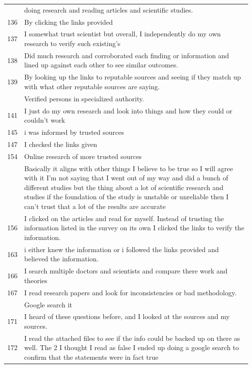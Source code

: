 \documentclass[
  doc,floatsintext]{apa6}
\begin{document}
\begin{longtable}[t]{>{}r>{\raggedright\arraybackslash}p{30em}}
\addlinespace
135 & doing research and reading articles and scientific studies.\\
136 & By clicking the links provided\\
137 & I somewhat trust scientist but overall, I independently do my own research to verify such existing's\\
138 & Did much research and corroborated each finding or information and lined up against each other to see similar outcomes.\\
139 & By looking up the links to reputable sources and seeing if they match up with what other reputable sources are saying.\\
\addlinespace
140 & Verified persons in specialized authority.\\
141 & I just do my own research and look into things and how they could or couldn’t work\\
145 & i was informed  by trusted sources\\
147 & I checked the links given\\
154 & Online research of more trusted sources\\
\addlinespace
155 & Basically it aligns with other things I believe to be true so I will agree with it I'm not saying that I went out of my way and did a bunch of different studies but the thing about a lot of scientific research and studies if the foundation of the study is unstable or unreliable then I can't trust that a lot of the results are accurate\\
156 & I clicked on the articles and read for myself. Instead of trusting the information listed in the survey on its own I clicked the links to verify the information.\\
163 & i either knew the information or i followed the links provided and believed the information.\\
166 & I search multiple doctors and scientists and compare there work and theories\\
167 & I read research papers and look for inconsistencies or bad methodology.\\
\addlinespace
170 & Google search it\\
171 & I heard of these questions before, and I looked at the sources and my sources.\\
172 & I read the attached files to see if the info could be backed up on there as well. The 2 I thought I read as false I ended up doing a google search to confirm that the statements were in fact true\\

\end{longtable}
\end{document}
